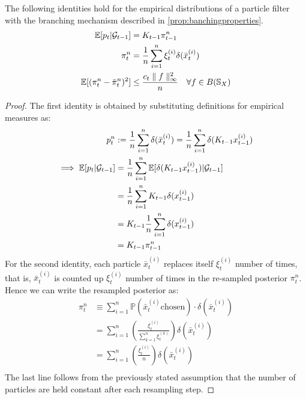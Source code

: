 \begin{lemma} The following identities hold for the empirical distributions of a particle filter with the branching mechanism described in \cref{prop:banchingproperties}.
	\begin{align}
	\mathbb{E}[p_t | \mathcal{G}_{t-1}] &= K_{t-1} \pi_{t-1}^n  \label{eqn:identity:dynamics}\\
	\pi_t^n &= \frac{1}{n}\sum_{i=1}^n \xi_t^{(i)} \delta(\bar{x}_t^{(i)})\\
	\mathbb{E}[(\pi_t^n - \bar{\pi}_t^n)^2] &\leq \frac{ c_t \parallel f \parallel_\infty^2}{n} \quad \forall f \in B(\mathbb{S}_X) \label{eqn:identity:pibar}
	\end{align}
	\begin{proof}
		The first identity is obtained by substituting definitions for empirical measures as:
		\begin{align}
		 p_t^n &:= \frac{1}{n}\sum_{i=1}^n \delta(\bar{x}_t^{(i)}) = \frac{1}{n}\sum_{i=1}^n \delta(K_{t-1} x_{t-1}^{(i)} ) \\
		 \implies \mathbb{E}[p_t | \mathcal{G}_{t-1}] &= \frac{1}{n}\sum_{i=1}^n  \mathbb{E}[\delta(K_{t-1} x_{t-1}^{(i)} ) | \mathcal{G}_{t-1}] \\
		 &= \frac{1}{n}\sum_{i=1}^n  K_{t-1} \delta( x_{t-1}^{(i)} ) \\
		 &= K_{t-1} \frac{1}{n}\sum_{i=1}^n  \delta( x_{t-1}^{(i)} ) \\
		 &= K_{t-1} \pi_{t-1}^n\\
		\end{align}
		For the second identity, each particle $\bar{x}_t^{(i)}$ replaces itself  $\xi_t^{(i)}$ number of times, that is,  $\bar{x}_t^{(i)}$ is counted up  $\xi_t^{(i)}$ number of times in the re-sampled posterior $\pi_t^n$. Hence we can write the resampled posterior as:
		\begin{align}
		\pi_t^n  &\equiv \sum_{i=1}^{n} \mathbb{P}(\bar{x}_t^{(i)} \mathrm{chosen})	\cdot \delta(\bar{x}_t^{(i)}) \\
		&= \sum_{i=1}^{n} \left(\frac{\xi_t^{(i)}}{\sum_{k=1}^n {\xi_t^{(k)}}} \right)	\delta(\bar{x}_t^{(i)}) \\
		&= \sum_{i=1}^{n} \left(\frac{\xi_t^{(i)}}{n} \right)	\delta(\bar{x}_t^{(i)}) \\
		\end{align} The last line follows from the previously stated assumption that the number of particles are held constant after each resampling step. 
		

\end{proof}
\end{lemma}
